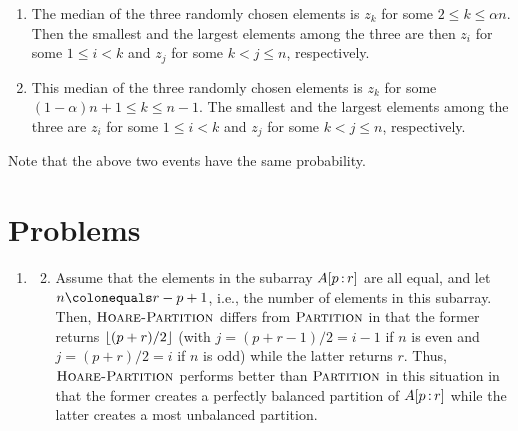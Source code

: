 \begin{enumerate}[\thesection-1]
\begin{enumerate}[(1)]
\item The median of the three randomly chosen elements is $z_k$ for some $2 \leq k \leq \alpha n$. Then the smallest and the largest elements among the three are then $z_i$ for some $1 \leq i < k$ and $z_j$ for some $k < j \leq n$, respectively.
\item This median of the three randomly chosen elements is $z_k$ for some $(1 - \alpha)n + 1 \leq k \leq n - 1$. The smallest and the largest elements among the three are $z_i$ for some $1 \leq i < k$ and $z_j$ for some $k < j \leq n$, respectively.
\end{enumerate}
Note that the above two events have the same probability.
%
\end{enumerate}


\section*{Problems}
\begin{enumerate}[\thechapter-1]
%
\item
\begin{enumerate}[\it a.]
\setcounter{enumii}{1}
\item Assume that the elements in the subarray $A[p \subarr r]$ are all equal, and let $n \defas r - p + 1$, i.e., the number of elements in this subarray. Then, $\textnormal{\scshape Hoare-Partition}$ differs from $\textnormal{\scshape Partition}$ in that the former returns $\left\lfloor(p + r)/2\right\rfloor$ (with $j = (p + r - 1)/2 = i - 1$ if $n$ is even and $j = (p + r)/2 = i$ if $n$ is odd) while the latter returns $r$. Thus, $\textnormal{\scshape Hoare-Partition}$ performs better than $\textnormal{\scshape Partition}$ in this situation in that the former creates a perfectly balanced partition of $A[p \subarr r]$ while the latter creates a most unbalanced partition.
\end{enumerate}
%
\end{enumerate}